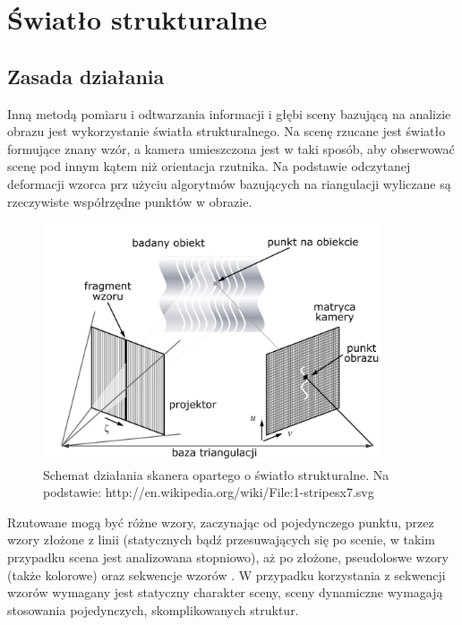 \section{Światło strukturalne}

\subsection{Zasada działania}

Inną metodą pomiaru i odtwarzania informacji i głębi sceny bazującą na analizie
obrazu jest wykorzystanie światła strukturalnego. Na scenę rzucane jest światło
formujące znany wzór, a kamera umieszczona jest w taki sposób, aby obserwować
scenę pod innym kątem niż orientacja rzutnika. Na podstawie odczytanej deformacji
wzorca prz użyciu algorytmów bazujących na riangulacji wyliczane są rzeczywiste
współrzędne punktów w obrazie.

\begin{figure}[htb!]
\centering
\includegraphics[width=10cm]{../../Common/img/struct}
\caption[Schemat działania skanera opartego o światło strukturalne]
{Schemat działania skanera opartego o światło strukturalne. Na podstawie:
http://en.wikipedia.org/wiki/File:1-stripesx7.svg}
\label{fig:struct_principle}
\end{figure}

Rzutowane mogą być różne wzory, zaczynając od pojedynczego punktu, przez
wzory złożone z linii (statycznych bądź przesuwających się po
scenie, w takim przypadku scena jest analizowana stopniowo), aż po złożone,
pseudoloswe wzory (także kolorowe) oraz sekwencje wzorów \cite{1588327}. W
przypadku korzystania z sekwencji wzorów wymagany jest statyczny charakter
sceny, sceny dynamiczne wymagają stosowania pojedynczych, skomplikowanych
struktur.


